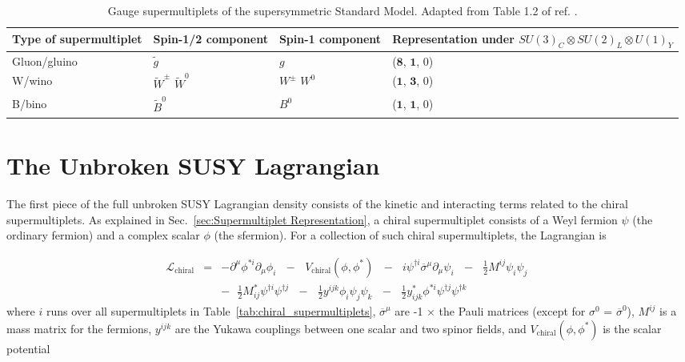 \documentclass[dissertation.tex]{subfiles}
\begin{document}
\begin{table}[htbp]
\caption{Gauge supermultiplets of the supersymmetric Standard Model.  Adapted from Table 1.2 of ref. \cite{SUSY_primer}.}
\begin{tabular}{|m{5.45cm}|m{2cm}|m{2cm}|m{4cm}|}
\hline
Type of supermultiplet & Spin-1/2 component & Spin-1 component & Representation under $SU(3)_{C} \otimes SU(2)_{L} \otimes U(1)_{Y}$ \\
\hline
\hline
Gluon/gluino & $\widetilde{g}$ & $g$ & ($\mathbf{8}$, $\mathbf{1}$, 0) \\
\hline
W/wino & $\widetilde{W}^{\pm}$ $\widetilde{W}^{0}$ & $W^{\pm}$ $W^{0}$ & ($\mathbf{1}$, $\mathbf{3}$, 0) \\
\hline
B/bino & $\widetilde{B}^{0}$ & $B^{0}$ & ($\mathbf{1}$, $\mathbf{1}$, 0) \\
\hline
\end{tabular}
\label{tab:gauge_supermultiplets}
\end{table}

\section{The Unbroken SUSY Lagrangian}
\label{sec:The Unbroken SUSY Lagrangian}

The first piece of the full unbroken SUSY Lagrangian density consists of the kinetic and interacting terms related to the chiral supermultiplets.  As explained in Sec.~\ref{sec:Supermultiplet Representation}, a chiral supermultiplet consists of a Weyl fermion $\psi$ (the ordinary fermion) and a complex scalar $\phi$ (the sfermion).  For a collection of such chiral supermultiplets, the Lagrangian is

\begin{eqnarray}
\label{eq:L_chiral}
\mathcal{L}_{\mathrm{chiral}} &=& -\partial^{\mu}\phi^{*i}\partial_{\mu}\phi_{i}\mbox{ }-\mbox{ }V_{\mathrm{chiral}}(\phi, \phi^{*})\mbox{ }-\mbox{ }i\psi^{\dag i}\overline{\sigma}^{\mu}\partial_{\mu}\psi_{i}\mbox{ }-\mbox{ }\frac{1}{2}M^{ij}\psi_{i}\psi_{j}\mbox{ }\nonumber \\
&&-\mbox{ }\frac{1}{2}M_{ij}^{*}\psi^{\dag i}\psi^{\dag j}\mbox{ }-\mbox{ }\frac{1}{2}y^{ijk}\phi_{i}\psi_{j}\psi_{k}\mbox{ }-\mbox{ }\frac{1}{2}y_{ijk}^{*}\phi^{*i}\psi^{\dag j}\psi^{\dag k}
\end{eqnarray}
where $i$ runs over all supermultiplets in Table~\ref{tab:chiral_supermultiplets}, $\overline{\sigma}^{\mu}$ are -1 $\times$ the Pauli matrices (except for $\sigma^{0}$ = $\overline{\sigma}^{0}$), $M^{ij}$ is a mass matrix for the fermions, $y^{ijk}$ are the Yukawa couplings between one scalar and two spinor fields, and $V_{\mathrm{chiral}}(\phi, \phi^{*})$ is the scalar potential
\end{document}
